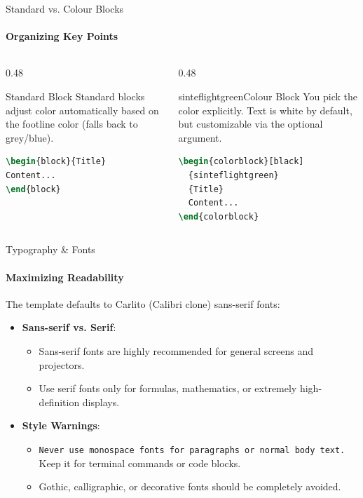 \begin{frame}[fragile]{Standard vs. Colour Blocks}
\framesubtitle{Organizing Key Points}
\begin{columns}[T]
    \begin{column}{0.48\textwidth}
        \begin{block}{Standard Block}
        Standard blocks adjust color automatically based on the footline color (falls back to grey/blue).
\begin{lstlisting}[language=TeX]
\begin{block}{Title}
Content...
\end{block}
\end{lstlisting}
        \end{block}
    \end{column}
    \begin{column}{0.48\textwidth}
        \begin{colorblock}[black]{sinteflightgreen}{Colour Block}
        You pick the color explicitly. Text is white by default, but customizable via the optional argument.
\begin{lstlisting}[language=TeX]
\begin{colorblock}[black]
  {sinteflightgreen}
  {Title}
  Content...
\end{colorblock}
\end{lstlisting}
        \end{colorblock}
    \end{column}
\end{columns}
\end{frame}

\begin{frame}{Typography \& Fonts}
\framesubtitle{Maximizing Readability}
The template defaults to Carlito (Calibri clone) sans-serif fonts:
\begin{itemize}
    \item \textbf{Sans-serif vs. Serif}:
    \begin{itemize}
        \item \textsf{Sans-serif fonts} are highly recommended for general screens and projectors.
        \item \textrm{Use serif fonts only for formulas, mathematics, or extremely high-definition displays}.
    \end{itemize}
    \item \textbf{Style Warnings}:
    \begin{itemize}
        \item \texttt{Never use monospace fonts for paragraphs or normal body text.} Keep it for terminal commands or code blocks.
        \item {\frakfamily Gothic, calligraphic, or decorative fonts should be completely avoided.}
    \end{itemize}
\end{itemize}
\end{frame}
